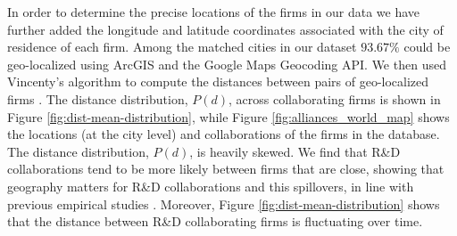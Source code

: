 In order to determine the precise locations of the firms in our
data we have further added the longitude and latitude coordinates associated with the city of residence of each firm. Among the matched cities in our dataset $93.67\%$ could be geo-localized using ArcGIS \citep[see e.g.,][]{Dell2009} and the Google Maps Geocoding API. We then used Vincenty's algorithm to compute the distances between pairs of
geo-localized firms \citep{Vincenty1975}. %
The distance distribution, $P(d)$, across collaborating firms is shown in Figure \ref{fig:dist-mean-distribution}, while Figure \ref{fig:alliances_world_map} shows the locations (at the city level) and collaborations of the firms in the database. The distance distribution, $P(d) $, is heavily skewed. We find that R\&D collaborations tend to be more likely between firms that are close, showing that geography matters for R\&D collaborations and this spillovers, in line with previous empirical studies \citep{Lychagin2010}. Moreover, Figure \ref{fig:dist-mean-distribution} shows that the distance between R\&D collaborating firms is fluctuating over time.


